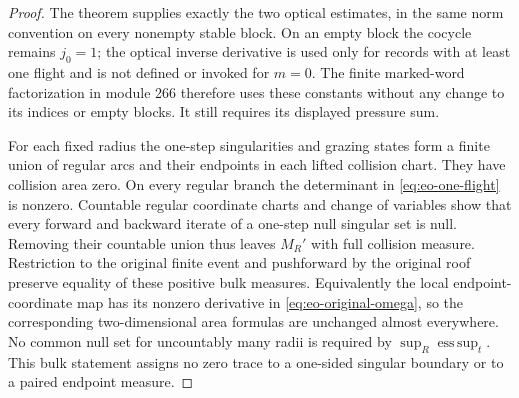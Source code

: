 \begin{proof}
The theorem supplies exactly the two optical estimates, in the
same norm convention on every nonempty stable block.  On an
empty block the cocycle remains $j_0=1$; the optical inverse
derivative is used only for records with at least one flight and
is not defined or invoked for $m=0$.
The finite marked-word factorization in module 266 therefore
uses these constants without any change to its indices or empty
blocks.  It still requires its displayed pressure sum.

For each fixed radius the one-step singularities and grazing
states form a finite union of regular arcs and their endpoints
in each lifted collision chart.  They have collision area zero.
On every regular branch the determinant in
\eqref{eq:eo-one-flight} is nonzero.  Countable regular
coordinate charts and change of variables show that every
forward and backward iterate of a one-step null singular set is
null.  Removing their countable union thus leaves $M_R'$ with
full collision measure.  Restriction to the original finite
event and pushforward by the original roof preserve equality
of these positive bulk measures.  Equivalently the local
endpoint-coordinate map has its nonzero derivative in
\eqref{eq:eo-original-omega}, so the corresponding
two-dimensional area formulas are unchanged almost everywhere.
No common null set for uncountably many radii is required by
$\sup_R\operatorname*{ess\,sup}_t$.
This bulk statement assigns no zero trace to a one-sided
singular boundary or to a paired endpoint measure.
\end{proof}
